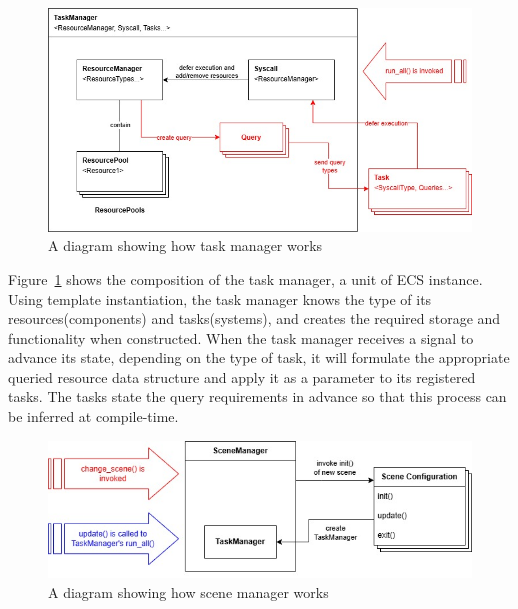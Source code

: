 \vspace{0.5cm}

\begin{figure}[h]
    \centering
    \includegraphics[width=\columnwidth, keepaspectratio]{images/taskmanager}
    \caption{A diagram showing how task manager works}
    \label{fig:taskmanager}
\end{figure}

\vspace{0.5cm}

\noindent Figure~\ref{fig:taskmanager} shows the composition of the task manager, a unit of ECS instance.
Using template instantiation, the task manager knows the type of its resources(components) and tasks(systems),
and creates the required storage and functionality when constructed.
When the task manager receives a signal to advance its state, depending on the type of task, it will
formulate the appropriate queried resource data structure and apply it as a parameter to its registered tasks.
The tasks state the query requirements in advance so that this process can be inferred at compile-time.

\vspace{0.5cm}

\begin{figure}[h]
    \centering
    \includegraphics[width=\columnwidth, keepaspectratio]{images/scenemanager}
    \caption{A diagram showing how scene manager works}
    \label{fig:scenemanager}
\end{figure}

